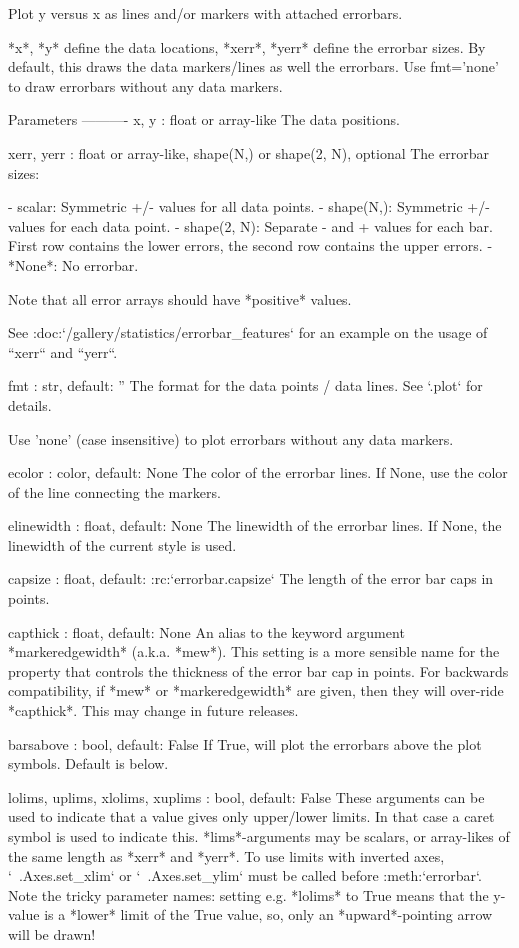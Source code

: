 \begin{DoxyVerb}Plot y versus x as lines and/or markers with attached errorbars.

*x*, *y* define the data locations, *xerr*, *yerr* define the errorbar
sizes. By default, this draws the data markers/lines as well the
errorbars. Use fmt='none' to draw errorbars without any data markers.

Parameters
----------
x, y : float or array-like
    The data positions.

xerr, yerr : float or array-like, shape(N,) or shape(2, N), optional
    The errorbar sizes:

    - scalar: Symmetric +/- values for all data points.
    - shape(N,): Symmetric +/-values for each data point.
    - shape(2, N): Separate - and + values for each bar. First row
      contains the lower errors, the second row contains the upper
      errors.
    - *None*: No errorbar.

    Note that all error arrays should have *positive* values.

    See :doc:`/gallery/statistics/errorbar_features`
    for an example on the usage of ``xerr`` and ``yerr``.

fmt : str, default: ''
    The format for the data points / data lines. See `.plot` for
    details.

    Use 'none' (case insensitive) to plot errorbars without any data
    markers.

ecolor : color, default: None
    The color of the errorbar lines.  If None, use the color of the
    line connecting the markers.

elinewidth : float, default: None
    The linewidth of the errorbar lines. If None, the linewidth of
    the current style is used.

capsize : float, default: :rc:`errorbar.capsize`
    The length of the error bar caps in points.

capthick : float, default: None
    An alias to the keyword argument *markeredgewidth* (a.k.a. *mew*).
    This setting is a more sensible name for the property that
    controls the thickness of the error bar cap in points. For
    backwards compatibility, if *mew* or *markeredgewidth* are given,
    then they will over-ride *capthick*. This may change in future
    releases.

barsabove : bool, default: False
    If True, will plot the errorbars above the plot
    symbols. Default is below.

lolims, uplims, xlolims, xuplims : bool, default: False
    These arguments can be used to indicate that a value gives only
    upper/lower limits.  In that case a caret symbol is used to
    indicate this. *lims*-arguments may be scalars, or array-likes of
    the same length as *xerr* and *yerr*.  To use limits with inverted
    axes, `~.Axes.set_xlim` or `~.Axes.set_ylim` must be called before
    :meth:`errorbar`.  Note the tricky parameter names: setting e.g.
    *lolims* to True means that the y-value is a *lower* limit of the
    True value, so, only an *upward*-pointing arrow will be drawn!


\end{DoxyVerb}
